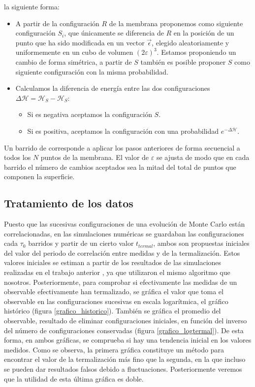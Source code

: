  la siguiente forma:
\begin{itemize}
\item A partir de la configuración $R$ de la membrana proponemos como
  siguiente configuración $S_i$, que únicamente se diferencia de $R$ en la
  posición de un punto que ha sido modificada en un vector $\vec{\epsilon}$,
  elegido aleatoriamente y uniformemente en un cubo de volumen 
  $(2\varepsilon)^3$. Estamos proponiendo un cambio de forma simétrica, a
  partir de $S$ también es posible proponer $S$ como siguiente configuración
  con la misma probabilidad.
\item Calculamos la diferencia de energía entre las dos configuraciones
  $\Delta\mathcal{H}=\mathcal{H}_S-\mathcal{H}_S$:
  \begin{itemize}
    \item Si es negativa aceptamos la configuración $S$.
    \item Si es positiva, aceptamos la configuración con una probabilidad $e^{-\Delta\mathcal{H}}$.
  \end{itemize}
\end{itemize}

Un barrido de corresponde a aplicar los pasos anteriores de forma secuencial a
todos los $N$ puntos de la membrana. El valor de $\varepsilon$ se ajusta de
modo que en cada barrido el número de cambios aceptados sea la mitad del total
de puntos que componen la superficie. 
 
\subsection{Tratamiento de los datos}

Puesto que las sucesivas configuraciones de una evolución de Monte Carlo están
correlacionadas, en las simulaciones numéricas se guardaban las configuraciones cada $\tau_0$
barridos y partir de un cierto valor $t_{termal}$, ambos son propuestas
iniciales del valor del periodo de correlación entre medidas y de la
termalización. Estos valores iniciales se estiman a partir de los resultados de las
simulaciones realizadas en el trabajo anterior \cite{Bowick_flat_phase}, ya 
que utilizaron el mismo algoritmo que nosotros. Posteriormente, para comprobar
si efectivamente las medidas de un observable efectivamente han termalizado, se
gráfica el valor que toma el observable en las
configuraciones sucesivas en escala logarítmica, el gráfico histórico (figura
\ref{grafico_historico}). También se gráfica el promedio del observable,
resultado de eliminar configuraciones iniciales, en función del inverso del
número de configuraciones conservadas (figura \ref{grafico_logtermal}). De
esta forma, en ambos gráficas, se comprueba si hay una tendencia inicial en
los valores medidos. Como se observa, la primera gráfica constituye un método
para encontrar el valor de la termalización más fino que la segunda,
en la que incluso se pueden dar resultados falsos debido a
fluctuaciones. Posteriormente veremos que la utilidad de esta última gráfica
es doble. 

